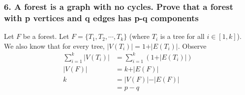 \documentclass{report}
\begin{document}
\subsubsection{6. A forest is a graph with no cycles. Prove that a forest with p vertices and q edges has p-q components}
Let $F$ be a forest. Let $F = \{T_1, T_2, \cdots, T_k\}$ (where $T_i$ is a tree for all $i \in [1,k]$). We also know that for every tree, $\vert V(T_i) \vert = 1 + \vert E(T_i) \vert$. Observe
\begin{align}
\sum_{i=1}^k \vert V(T_i) \vert &= \sum_{i=1}^k (1 + \vert E(T_i) \vert) \\
\vert V(F) \vert &= k + \vert E(F) \vert\\
k &= \vert V(F) \vert-\vert E(F) \vert \\
&= p - q
\end{align}
\end{document}
